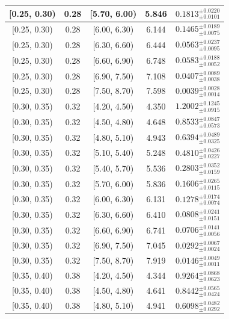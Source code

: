 \begin{longtable}{|c|c|c|c|c|}
\hline
[0.25, 0.30) & 0.28 & [5.70, 6.00) & 5.846 & $0.1813^{ \pm 0.0220 }_{ \pm 0.0101 }$ \\ 
\hline
[0.25, 0.30) & 0.28 & [6.00, 6.30) & 6.144 & $0.1465^{ \pm 0.0189 }_{ \pm 0.0075 }$ \\ 
\hline
[0.25, 0.30) & 0.28 & [6.30, 6.60) & 6.444 & $0.0563^{ \pm 0.0237 }_{ \pm 0.0095 }$ \\ 
\hline
[0.25, 0.30) & 0.28 & [6.60, 6.90) & 6.748 & $0.0583^{ \pm 0.0188 }_{ \pm 0.0052 }$ \\ 
\hline
[0.25, 0.30) & 0.28 & [6.90, 7.50) & 7.108 & $0.0407^{ \pm 0.0089 }_{ \pm 0.0038 }$ \\ 
\hline
[0.25, 0.30) & 0.28 & [7.50, 8.70) & 7.598 & $0.0039^{ \pm 0.0028 }_{ \pm 0.0014 }$ \\ 
\hline
[0.30, 0.35) & 0.32 & [4.20, 4.50) & 4.350 & $1.2002^{ \pm 0.1245 }_{ \pm 0.0915 }$ \\ 
\hline
[0.30, 0.35) & 0.32 & [4.50, 4.80) & 4.648 & $0.8533^{ \pm 0.0847 }_{ \pm 0.0573 }$ \\ 
\hline
[0.30, 0.35) & 0.32 & [4.80, 5.10) & 4.943 & $0.6394^{ \pm 0.0489 }_{ \pm 0.0325 }$ \\ 
\hline
[0.30, 0.35) & 0.32 & [5.10, 5.40) & 5.248 & $0.4810^{ \pm 0.0426 }_{ \pm 0.0227 }$ \\ 
\hline
[0.30, 0.35) & 0.32 & [5.40, 5.70) & 5.536 & $0.2803^{ \pm 0.0352 }_{ \pm 0.0159 }$ \\ 
\hline
[0.30, 0.35) & 0.32 & [5.70, 6.00) & 5.836 & $0.1606^{ \pm 0.0265 }_{ \pm 0.0115 }$ \\ 
\hline
[0.30, 0.35) & 0.32 & [6.00, 6.30) & 6.131 & $0.1278^{ \pm 0.0174 }_{ \pm 0.0074 }$ \\ 
\hline
[0.30, 0.35) & 0.32 & [6.30, 6.60) & 6.410 & $0.0808^{ \pm 0.0241 }_{ \pm 0.0151 }$ \\ 
\hline
[0.30, 0.35) & 0.32 & [6.60, 6.90) & 6.741 & $0.0706^{ \pm 0.0141 }_{ \pm 0.0056 }$ \\ 
\hline
[0.30, 0.35) & 0.32 & [6.90, 7.50) & 7.045 & $0.0292^{ \pm 0.0067 }_{ \pm 0.0024 }$ \\ 
\hline
[0.30, 0.35) & 0.32 & [7.50, 8.70) & 7.919 & $0.0146^{ \pm 0.0049 }_{ \pm 0.0011 }$ \\ 
\hline
[0.35, 0.40) & 0.38 & [4.20, 4.50) & 4.344 & $0.9264^{ \pm 0.0868 }_{ \pm 0.0623 }$ \\ 
\hline
[0.35, 0.40) & 0.38 & [4.50, 4.80) & 4.641 & $0.8442^{ \pm 0.0565 }_{ \pm 0.0424 }$ \\ 
\hline
[0.35, 0.40) & 0.38 & [4.80, 5.10) & 4.941 & $0.6098^{ \pm 0.0482 }_{ \pm 0.0292 }$ \\ 

\end{longtable}
